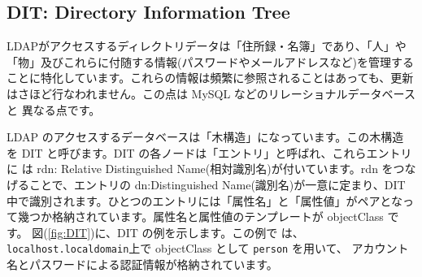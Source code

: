 \documentclass[mingoth,a4paper]{jsarticle}
\begin{document}
\subsection{DIT: Directory Information Tree}

LDAPがアクセスするディレクトリデータは「住所録・名簿」であり、「人」や
「物」及びこれらに付随する情報(パスワードやメールアドレスなど)を管理する
ことに特化しています。これらの情報は頻繁に参照されることはあっても、更新
はさほど行なわれません。この点は MySQL などのリレーショナルデータベースと
異なる点です。

LDAP のアクセスするデータベースは「木構造」になっています。この木構造
を DIT と呼びます。DIT の各ノードは「エントリ」と呼ばれ、これらエントリに
は rdn: Relative Distinguished Name(相対識別名)が付いています。rdn をつな
げることで、エントリの dn:Distinguished Name(識別名)が一意に定まり、DIT
中で識別されます。ひとつのエントリには「属性名」と「属性値」がペアとなっ
て幾つか格納されています。属性名と属性値のテンプレートが objectClass です。
図(\ref{fig:DIT})に、DIT の例を示します。この例で
は、\texttt{localhost.localdomain}上で objectClass として \texttt{person} を用いて、
アカウント名とパスワードによる認証情報が格納されています。
\end{document}
